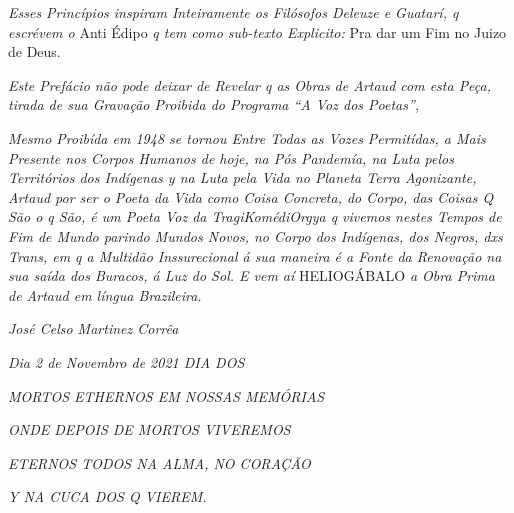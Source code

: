 \emph{Esses Princípios inspiram Inteiramente os Filósofos Deleuze e
Guatarí, q escrévem o} Anti Édipo \emph{q tem como sub-texto Explicito:}
Pra dar um Fim no Juizo de Deus.

\emph{Este Prefácio não pode deixar de Revelar q as Obras de Artaud com
esta Peça, tirada de sua Gravação Proibida do Programa ``A Voz dos
Poetas'',}

\emph{Mesmo Proibída em 1948 se tornou Entre Todas as Vozes Permitídas,
a Mais Presente nos Corpos Humanos de hoje, na Pós Pandemía, na Luta
pelos Territórios dos Indígenas y na Luta pela Vida no Planeta Terra
Agonizante, Artaud por ser o Poeta da Vida como Coisa Concreta, do
Corpo, das Coisas Q São o q São, é um Poeta Voz da TragiKomédiOrgya q
vivemos nestes Tempos de Fim de Mundo parindo Mundos Novos, no Corpo dos
Indígenas, dos Negros, dxs Trans, em q a Multidão Inssurecional á sua
maneira é a Fonte da Renovação na sua saída dos Buracos, á Luz do Sol. E
vem aí} HELIOGÁBALO \emph{a Obra Prima de Artaud em língua Brazileira.}

\bigskip

\hfill\emph{José Celso Martinez Corrêa}


\hfill\emph{Dia 2 de Novembro de 2021 DIA DOS}

\hfill\emph{MORTOS ETHERNOS EM NOSSAS MEMÓRIAS}

\hfill\emph{ONDE DEPOIS DE MORTOS VIVEREMOS}

\hfill\emph{ETERNOS TODOS NA ALMA, NO CORAÇÃO}

\hfill\emph{Y NA CUCA DOS Q VIEREM.}
